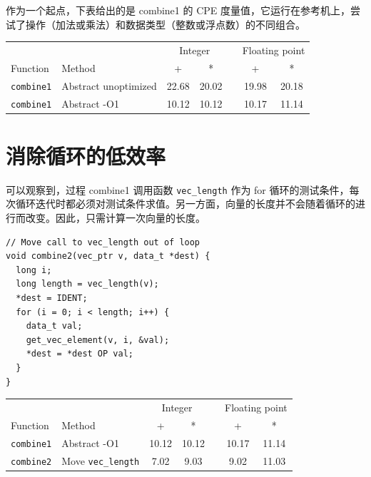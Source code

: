 作为一个起点，下表给出的是 combine1 的 CPE 度量值，它运行在参考机上，尝试了操作（加法或乘法）和数据类型（整数或浮点数）的不同组合。

\begin{table}[!ht]
    \centering
    \begin{tabular}{llccccc}
        \toprule
        & & \multicolumn{2}{c}{Integer} & & \multicolumn{2}{c}{Floating point} \\
        \cmidrule{3-4} \cmidrule{6-7}
        Function & Method & + & * & & + & * \\
        \midrule
        \texttt{combine1} & Abstract unoptimized & 22.68 & 20.02 & & 19.98 & 20.18 \\
        \texttt{combine1} & Abstract -O1 & 10.12 & 10.12 & & 10.17 & 11.14 \\
        \bottomrule
    \end{tabular}
\end{table}

\section{消除循环的低效率}

可以观察到，过程 combine1 调用函数 \verb|vec_length| 作为 for 循环的测试条件，每次循环迭代时都必须对测试条件求值。另一方面，向量的长度并不会随着循环的进行而改变。因此，只需计算一次向量的长度。

\begin{verbatim}
// Move call to vec_length out of loop
void combine2(vec_ptr v, data_t *dest) {
  long i;
  long length = vec_length(v);
  *dest = IDENT;
  for (i = 0; i < length; i++) {
    data_t val;
    get_vec_element(v, i, &val);
    *dest = *dest OP val;
  }
}
\end{verbatim}

\begin{table}[!ht]
    \centering
    \begin{tabular}{llccccc}
        \toprule
        & & \multicolumn{2}{c}{Integer} & & \multicolumn{2}{c}{Floating point} \\
        \cmidrule{3-4} \cmidrule{6-7}
        Function & Method & + & * & & + & * \\
        \midrule
        \texttt{combine1} & Abstract -O1 & 10.12 & 10.12 & & 10.17 & 11.14 \\
        \texttt{combine2} & Move \texttt{vec\_length} & 7.02 & 9.03 & & 9.02 & 11.03 \\
        \bottomrule
    \end{tabular}
\end{table}

